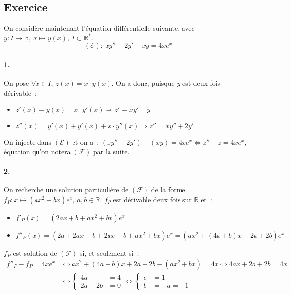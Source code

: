 \documentclass{article}
\begin{document}
    \subsection{Exercice}

    On considère maintenant l'équation différentielle suivante, avec $y\colon I\to\mathbb{R},\ x\mapsto y(x),\ I\subset\mathbb{R}^*$.
    \begin{displaymath}
      (\mathscr{E}):\ xy''+2y'-xy=4xe^x
    \end{displaymath}
    \paragraph{1.} On pose $\forall x\in I,\ z(x)=x\cdot y(x)$. On a donc, puisque $y$ est deux fois dérivable~:
    \begin{itemize}
      \item $z'(x)= y(x)+x\cdot y'(x)\Rightarrow z'=xy'+y$
      \item $z''(x)=y'(x)+y'(x)+x\cdot y''(x)\Rightarrow z''=xy''+2y'$
    \end{itemize}
    On injecte dans $(\mathscr{E})$ et on a~: $ (xy''+2y')-(xy)=4xe^x \iff z''-z=4xe^x$, équation qu'on notera $(\mathscr{F})$ par la suite.

    \paragraph{2.} On recherche une solution particulière de $(\mathscr{F})$ de la forme $f_P\colon x\mapsto (ax^2+bx)e^x,\ a,b\in\mathbb{R}$. $f_P$ est dérivable deux fois sur $\mathbb{R}$ et~:
    \begin{itemize}
      \item $f'_P(x) = (2ax+b+ax^2+bx)e^x$
      \item $f''_P(x) = (2a + 2ax + b + 2ax + b + ax^2 + bx)e^x = (ax^2+(4a+b)x + 2a + 2b)e^x$
    \end{itemize}
    $f_P$ est solution de  $(\mathscr{F})$ si, et seulement si~:
    \begin{align*}
      f''_P-f_P=4xe^x &\iff ax^2+(4a+b)x + 2a + 2b -(ax^2+bx) = 4x \iff 4ax + 2a + 2b = 4x \\
      &\iff\left\{
        \begin{array}{ll}
          4a  &=4 \\
          2a + 2b &=0
        \end{array}
      \right.
      \iff\left\{
        \begin{array}{ll}
          a  &=1 \\
          b &=-a = -1
        \end{array}
      \right.
    \end{align*}
\end{document}
